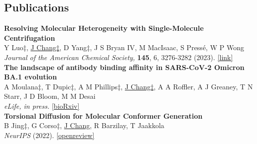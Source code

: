 \documentclass[margin,11pt]{res}
\begin{document}
\begin{resume}



\section{Publications}

\begin{changemargin}{-8.5em}{0em}
  \bigskip
  \bigskip
  \textbf{Resolving Molecular Heterogeneity with Single-Molecule Centrifugation}
    \\
    Y Luo‡, \underline{J Chang‡}, D Yang‡, J S Bryan IV, M MacIsaac, S Pressé, W P Wong
    \\
    \textit{Journal of the American Chemical Society,}
    \textbf{145}, 6, 
    3276-3282
    (2023).
    \href{http://dx.doi.org/10.1021/jacs.2c11450}{[link]}
    \\

    \textbf{The landscape of antibody binding affinity in SARS-CoV-2 Omicron BA.1 evolution}
    \\
    A Moulana‡, T Dupic‡, A M Phillips‡, \underline{J Chang‡}, A A Roffler, A J Greaney, T N Starr, J D Bloom, M M Desai
    \\
    \textit{eLife, in press.}
    \href{https://www.biorxiv.org/content/10.1101/2022.09.13.507781.abstract}{[bioRxiv]}
    \\

    \textbf{Torsional Diffusion for Molecular Conformer Generation}
    \\
    B Jing‡, G Corso‡, \underline{J Chang}, R Barzilay, T Jaakkola
    \\
    \textit{NeurIPS}
    (2022).
    \href{https://openreview.net/forum?id=w6fj2r62r_H}{[openreview]}
    \\


\end{changemargin}
\end{resume}
\end{document}
